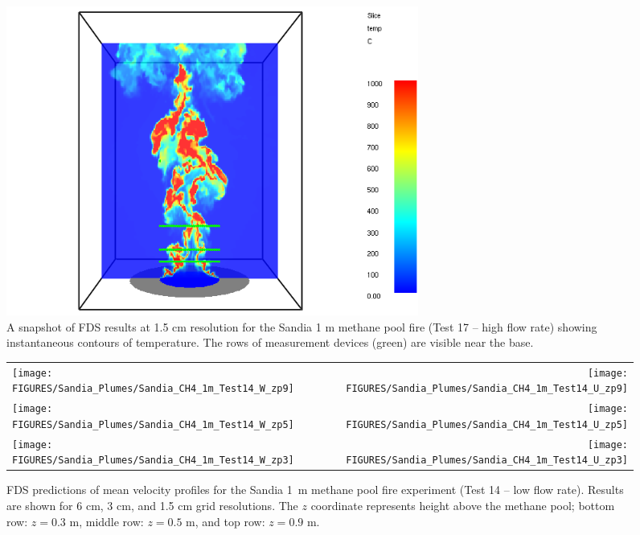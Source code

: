 \begin{figure}[h]
\begin{center}
\includegraphics[height=4in]{FIGURES/Sandia_Plumes/Sandia_CH4_1m_image}
\caption[Sandia 1~m methane pool fire instantaneous temperature contours.]{A snapshot of FDS results at 1.5 cm resolution for the Sandia 1 m methane pool fire (Test 17 -- high flow rate) showing instantaneous contours of temperature.  The rows of measurement devices (green) are visible near the base.}
\label{Sandia_CH4_1m_image}
\end{center}
\end{figure}

\begin{figure}[p]
\begin{tabular*}{\textwidth}{l@{\extracolsep{\fill}}r}
\texttt{[image: FIGURES/Sandia\_Plumes/Sandia\_CH4\_1m\_Test14\_W\_zp9]} &
\texttt{[image: FIGURES/Sandia\_Plumes/Sandia\_CH4\_1m\_Test14\_U\_zp9]} \\
\texttt{[image: FIGURES/Sandia\_Plumes/Sandia\_CH4\_1m\_Test14\_W\_zp5]} &
\texttt{[image: FIGURES/Sandia\_Plumes/Sandia\_CH4\_1m\_Test14\_U\_zp5]} \\
\texttt{[image: FIGURES/Sandia\_Plumes/Sandia\_CH4\_1m\_Test14\_W\_zp3]} &
\texttt{[image: FIGURES/Sandia\_Plumes/Sandia\_CH4\_1m\_Test14\_U\_zp3]}
\end{tabular*}
\caption[Sandia 1~m methane pool fire (Test 14) mean velocity profiles.]
{FDS predictions of mean velocity profiles for the Sandia 1~m methane pool fire experiment (Test 14 -- low flow rate). Results are shown for 6 cm, 3 cm, and 1.5 cm grid resolutions. The $z$ coordinate represents height above the methane pool; bottom row: $z=0.3$ m, middle row: $z=0.5$ m, and top row: $z=0.9$ m.}
\label{Sandia_CH4_1m_Test14_velocity}
\end{figure}

